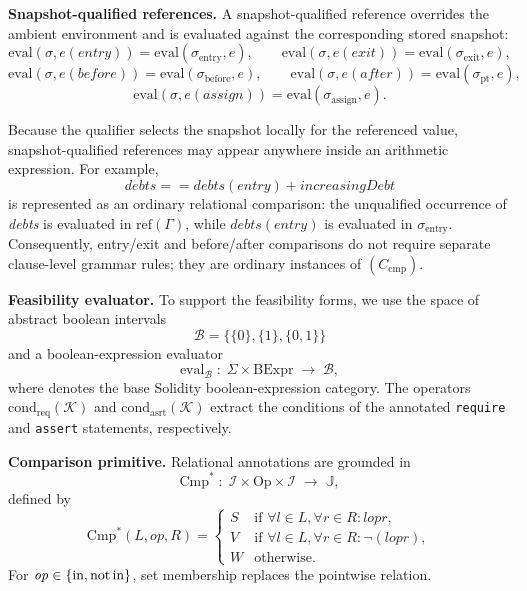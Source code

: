 \documentclass[pdflatex,sn-basic]{sn-jnl}%
\theoremstyle{thmstyleone}%
\theoremstyle{thmstyletwo}%
\theoremstyle{thmstylethree}%
\begin{document}
\smallskip
\noindent\textbf{Snapshot-qualified references.}
A snapshot-qualified reference overrides the ambient environment and is evaluated
against the corresponding stored snapshot:
\[
\text{eval}(\sigma, e(\mathit{entry}))
  = \text{eval}(\sigma_{\text{entry}}, e), \qquad
\text{eval}(\sigma, e(\mathit{exit}))
  = \text{eval}(\sigma_{\text{exit}}, e),
\]
\[
\text{eval}(\sigma, e(\mathit{before}))
  = \text{eval}(\sigma_{\text{before}}, e), \qquad
\text{eval}(\sigma, e(\mathit{after}))
  = \text{eval}(\sigma_{\text{pt}}, e),
\]
\[
\text{eval}(\sigma, e(\mathit{assign}))
  = \text{eval}(\sigma_{\text{assign}}, e).
\]

Because the qualifier selects the snapshot locally for the referenced value,
snapshot-qualified references may appear anywhere inside an arithmetic expression.
For example,
\[
\mathit{debts}
  == \mathit{debts}(\mathit{entry}) + \mathit{increasingDebt}
\]
is represented as an ordinary relational comparison:
the unqualified occurrence of \textit{debts} is evaluated in
$\mathrm{ref}(\Gamma)$, while
$\mathit{debts}(\mathit{entry})$ is evaluated in
$\sigma_{\text{entry}}$.
Consequently, entry/exit and before/after comparisons do not require separate
clause-level grammar rules; they are ordinary instances of $(C_{\text{cmp}})$.

\smallskip
\noindent\textbf{Feasibility evaluator.}
To support the feasibility forms, we use the space of abstract boolean intervals
\[
\mathcal{B} = \{\{0\}, \{1\}, \{0,1\}\}
\]
and a boolean-expression evaluator
\[
\text{eval}_{\mathcal{B}}
  \;:\; \Sigma \times \text{BExpr} \;\to\; \mathcal{B},
\]
where  denotes the base Solidity boolean-expression category.
The operators
$\text{cond}_{\text{req}}(\mathcal{K})$ and
$\text{cond}_{\text{asrt}}(\mathcal{K})$
extract the conditions of the annotated
\texttt{require} and \texttt{assert} statements, respectively.

\smallskip
\noindent\textbf{Comparison primitive.}
Relational annotations are grounded in
\[
\text{Cmp}^*
  \;:\; \mathcal{I} \times \text{Op} \times \mathcal{I}
  \;\to\; \mathbb{J},
\]
defined by
\[
\text{Cmp}^*(L,\mathit{op},R)
=
\begin{cases}
S & \text{if } \forall l \in L,\forall r \in R :
    l \mathrel{\mathit{op}} r, \\[2pt]
V & \text{if } \forall l \in L,\forall r \in R :
    \neg(l \mathrel{\mathit{op}} r), \\[2pt]
W & \text{otherwise.}
\end{cases}
\]
For $\mathit{op}\in\{\text{in},\text{not\,in}\}$, set membership replaces
the pointwise relation.
\end{document}
